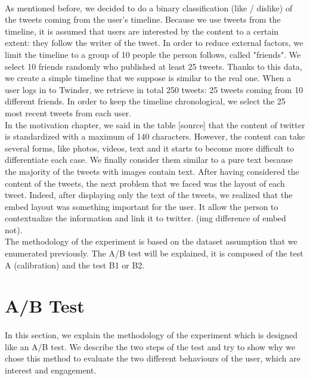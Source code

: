 \paragraph{}
As mentioned before, we decided to do a binary classification (like / dislike) of the tweets coming from the user's timeline. Because we use tweets from the timeline, it is assumed that users are interested by the content to a certain extent: they follow the writer of the tweet. In order to reduce external factors, we limit the timeline to a group of 10 people the person follows, called "friends". We select 10 friends randomly who published at least 25 tweets. Thanks to this data, we create a simple timeline that we suppose is similar to the real one. When a user logs in to Twinder, we retrieve in total 250 tweets: 25 tweets coming from 10 different friends. In order to keep the timeline chronological, we select the 25 most recent tweets from each user. \\
In the motivation chapter, we said in the table [source] that the content of twitter is standardized with a maximum of 140 characters. However, the content can take several forms, like photos, videos, text and it starts to become more difficult to differentiate each case. We finally consider them similar to a pure text because the majority of the tweets with images contain text. After having considered the content of the tweets, the next problem that we faced was the layout of each tweet. Indeed, after displaying only the text of the tweets, we realized that the embed layout was something important for the user. It allow the person to contextualize the information and link it to twitter. (img difference of embed not). \\
The methodology of the experiment is based on the dataset assumption that we enumerated previously. The A/B test will be explained, it is composed of the test A (calibration) and the test B1 or B2.  

\section{A/B Test}

\paragraph{}
In this section, we explain the methodology of the experiment which is designed like an A/B test. We describe the two steps of the test and try to show why we chose this method to evaluate the two different behaviours of the user, which are interest and engagement.

